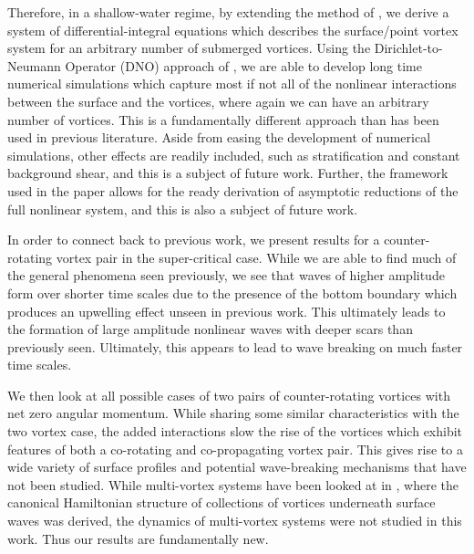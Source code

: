 \documentclass[a4paper,11pt]{article}
\begin{document}
Therefore, in a shallow-water regime, by extending the method of \cite{afm}, we derive a system of differential-integral equations which describes the surface/point vortex system for an arbitrary number of submerged vortices.  Using the Dirichlet-to-Neumann Operator (DNO) approach of \cite{craig}, we are able to develop long time numerical simulations which capture most if not all of the nonlinear interactions between the surface and the vortices, where again we can have an arbitrary number of vortices.  This is a fundamentally  different approach than has been used in previous literature.  Aside from easing the development of numerical simulations, other effects are readily included, such as stratification and constant background shear, and this is a subject of future work.  Further, the framework used in the paper allows for the ready derivation of asymptotic reductions of the full nonlinear system, and this is also a subject of future work.  

In order to connect back to previous work, we present results for a counter-rotating vortex pair in the super-critical case.  While we are able to find much of the general phenomena seen previously, we see that waves of higher amplitude form over shorter time scales due to the presence of the bottom boundary which produces an upwelling effect unseen in previous work.  This ultimately leads to the formation of large amplitude nonlinear waves with deeper scars than previously seen.  Ultimately, this appears to lead to wave breaking on much faster time scales.    

We then look at all possible cases of two pairs of counter-rotating vortices with net zero angular momentum.  While sharing some similar characteristics with the two vortex case, the added interactions slow the rise of the vortices which exhibit features of both a co-rotating and co-propagating vortex pair.  This gives rise to a wide variety of surface profiles and potential wave-breaking mechanisms that have not been studied.  While multi-vortex systems have been looked at in \cite{rouhi}, where the canonical Hamiltonian structure of collections of vortices underneath surface waves was derived,   the dynamics of multi-vortex systems were not studied in this work.  Thus our results are fundamentally new. 

\end{document}
